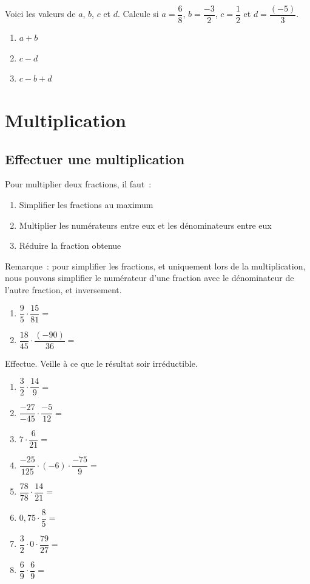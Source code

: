 \documentclass[../math2.tex]{subfiles}
\begin{document}
\begin{exercise}
  Voici les valeurs de $a$, $b$, $c$ et $d$. Calcule si 
  \vspace{1cm}
  $a=\dfrac{6}{8}$, 
  $b=\dfrac{-3}{2}$,
  $c=\dfrac{1}{2}$ et 
  $d=\dfrac{(-5)}{3}$.
  \begin{enumerate}[cols=3, ]
    \item $a+b$
    \item $c-d$
    \item $c-b+d$
  \end{enumerate}
  \vspace*{3cm}
\end{exercise}

\newpage
\section{Multiplication}
\subsection{Effectuer une multiplication}
Pour multiplier deux fractions, il faut~:
\begin{enumerate}[label=\arabic*]
  \item Simplifier les fractions au maximum
  \item Multiplier les numérateurs entre eux et les dénominateurs entre eux
  \item Réduire la fraction obtenue
\end{enumerate}

Remarque~: pour simplifier les fractions, et uniquement lors de la multiplication, nous pouvons simplifier le numérateur d'une fraction avec le dénominateur de l'autre fraction, et inversement.

\exemple 
\begin{enumerate}[cols=2]
  \item $\dfrac{9}{5} \cdot \dfrac{15}{81}=$
  \item $\dfrac{18}{45} \cdot \dfrac{(-90)}{36}=$
\end{enumerate}
\vspace*{2cm}

\begin{exercise}
  Effectue. Veille à ce que le résultat soir irréductible.
  \begin{enumerate}[cols=2, itemsep=2cm]
    \item $\dfrac{3}{2} \cdot \dfrac{14}{9}=$
    \item $\dfrac{-27}{-45} \cdot \dfrac{-5}{12}=$
    \item $7 \cdot \dfrac{6}{21}=$
    \item $\dfrac{-25}{125} \cdot (-6) \cdot \dfrac{-75}{9}=$
    \item $\dfrac{78}{78} \cdot \dfrac{14}{21}=$
    \item $0,75\cdot \dfrac{8}{5}=$
    \item $\dfrac{3}{2} \cdot 0 \cdot \dfrac{79}{27}=$
    \item $\dfrac{6}{9} \cdot \dfrac{6}{9}=$
  \end{enumerate}
  \vspace*{2cm}
\end{exercise}
\end{document}
